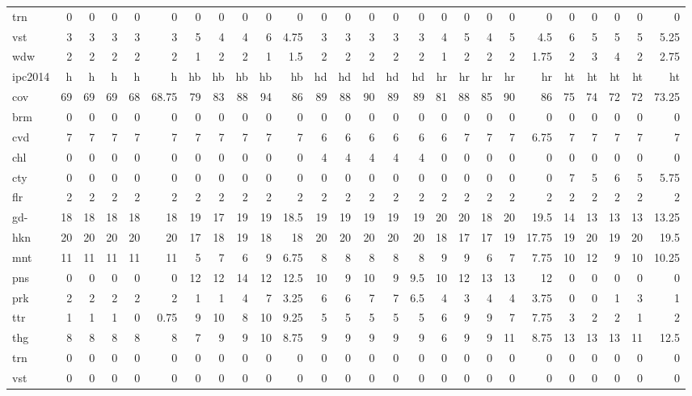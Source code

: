 \begin{center}
\begin{tabular}{lrrrrrrrrrrrrrrrrrrrrrrrrr}
trn & 0 & 0 & 0 & 0 & 0 & 0 & 0 & 0 & 0 & 0 & 0 & 0 & 0 & 0 & 0 & 0 & 0 & 0 & 0 & 0 & 0 & 0 & 0 & 0 & 0\\
vst & 3 & 3 & 3 & 3 & 3 & 5 & 4 & 4 & 6 & 4.75 & 3 & 3 & 3 & 3 & 3 & 4 & 5 & 4 & 5 & 4.5 & 6 & 5 & 5 & 5 & 5.25\\
wdw & 2 & 2 & 2 & 2 & 2 & 1 & 2 & 2 & 1 & 1.5 & 2 & 2 & 2 & 2 & 2 & 1 & 2 & 2 & 2 & 1.75 & 2 & 3 & 4 & 2 & 2.75\\
\hline
ipc2014 & h & h & h & h & h & hb & hb & hb & hb & hb & hd & hd & hd & hd & hd & hr & hr & hr & hr & hr & ht & ht & ht & ht & ht\\
\hline
cov & 69 & 69 & 69 & 68 & 68.75 & 79 & 83 & 88 & 94 & 86 & 89 & 88 & 90 & 89 & 89 & 81 & 88 & 85 & 90 & 86 & 75 & 74 & 72 & 72 & 73.25\\
brm & 0 & 0 & 0 & 0 & 0 & 0 & 0 & 0 & 0 & 0 & 0 & 0 & 0 & 0 & 0 & 0 & 0 & 0 & 0 & 0 & 0 & 0 & 0 & 0 & 0\\
cvd & 7 & 7 & 7 & 7 & 7 & 7 & 7 & 7 & 7 & 7 & 6 & 6 & 6 & 6 & 6 & 6 & 7 & 7 & 7 & 6.75 & 7 & 7 & 7 & 7 & 7\\
chl & 0 & 0 & 0 & 0 & 0 & 0 & 0 & 0 & 0 & 0 & 4 & 4 & 4 & 4 & 4 & 0 & 0 & 0 & 0 & 0 & 0 & 0 & 0 & 0 & 0\\
cty & 0 & 0 & 0 & 0 & 0 & 0 & 0 & 0 & 0 & 0 & 0 & 0 & 0 & 0 & 0 & 0 & 0 & 0 & 0 & 0 & 7 & 5 & 6 & 5 & 5.75\\
flr & 2 & 2 & 2 & 2 & 2 & 2 & 2 & 2 & 2 & 2 & 2 & 2 & 2 & 2 & 2 & 2 & 2 & 2 & 2 & 2 & 2 & 2 & 2 & 2 & 2\\
gd- & 18 & 18 & 18 & 18 & 18 & 19 & 17 & 19 & 19 & 18.5 & 19 & 19 & 19 & 19 & 19 & 20 & 20 & 18 & 20 & 19.5 & 14 & 13 & 13 & 13 & 13.25\\
hkn & 20 & 20 & 20 & 20 & 20 & 17 & 18 & 19 & 18 & 18 & 20 & 20 & 20 & 20 & 20 & 18 & 17 & 17 & 19 & 17.75 & 19 & 20 & 19 & 20 & 19.5\\
mnt & 11 & 11 & 11 & 11 & 11 & 5 & 7 & 6 & 9 & 6.75 & 8 & 8 & 8 & 8 & 8 & 9 & 9 & 6 & 7 & 7.75 & 10 & 12 & 9 & 10 & 10.25\\
pns & 0 & 0 & 0 & 0 & 0 & 12 & 12 & 14 & 12 & 12.5 & 10 & 9 & 10 & 9 & 9.5 & 10 & 12 & 13 & 13 & 12 & 0 & 0 & 0 & 0 & 0\\
prk & 2 & 2 & 2 & 2 & 2 & 1 & 1 & 4 & 7 & 3.25 & 6 & 6 & 7 & 7 & 6.5 & 4 & 3 & 4 & 4 & 3.75 & 0 & 0 & 1 & 3 & 1\\
ttr & 1 & 1 & 1 & 0 & 0.75 & 9 & 10 & 8 & 10 & 9.25 & 5 & 5 & 5 & 5 & 5 & 6 & 9 & 9 & 7 & 7.75 & 3 & 2 & 2 & 1 & 2\\
thg & 8 & 8 & 8 & 8 & 8 & 7 & 9 & 9 & 10 & 8.75 & 9 & 9 & 9 & 9 & 9 & 6 & 9 & 9 & 11 & 8.75 & 13 & 13 & 13 & 11 & 12.5\\
trn & 0 & 0 & 0 & 0 & 0 & 0 & 0 & 0 & 0 & 0 & 0 & 0 & 0 & 0 & 0 & 0 & 0 & 0 & 0 & 0 & 0 & 0 & 0 & 0 & 0\\
vst & 0 & 0 & 0 & 0 & 0 & 0 & 0 & 0 & 0 & 0 & 0 & 0 & 0 & 0 & 0 & 0 & 0 & 0 & 0 & 0 & 0 & 0 & 0 & 0 & 0\\
\hline
\end{tabular}
\end{center}


